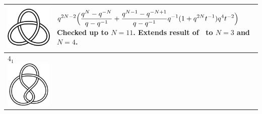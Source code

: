 \documentclass{compositio}
\theoremstyle{definition}
\numberwithin{equation}{section}
\begin{document}
{\begin{longtable}{p{}|p{}}
\includegraphics[scale=0.07,angle=0]{knot3_1.pdf} 
& 
\newline
$
\displaystyle{%
q^{2N-2} \Big( \frac{q^N-q^{-N}}{q-q^{-1}} + \frac{q^{N-1}-q^{-N+1}}{q-q^{-1}} q^{-1} (1 + q^{2N} t^{-1}) q^{4} t^{-2} \Big)
}
$
\newline\newline\newline
Checked up to $N=11$. Extends result of~\cite{r0508510} to $N=3$ and $N=4$. 
\\
\hline
$4_{1}$ 
\includegraphics[scale=0.07,angle=0]{knot4_1.pdf} 

\end{longtable}}
\end{document}
